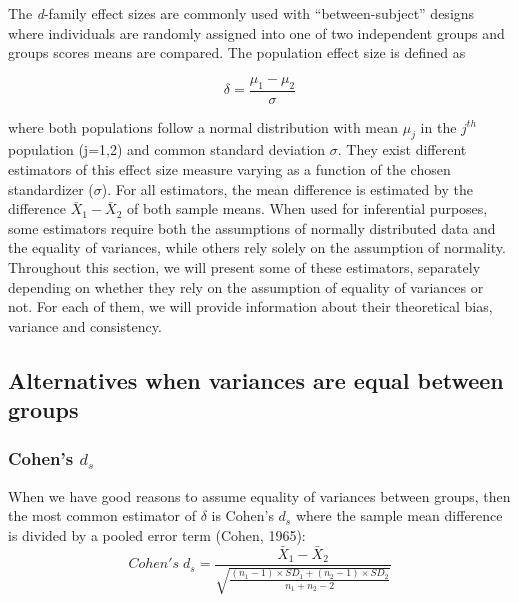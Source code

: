 \documentclass[
  man,floatsintext]{apa6}
\begin{document}
The \emph{d}-family effect sizes are commonly used with \enquote{between-subject} designs where individuals are randomly assigned into one of two independent groups and groups scores means are compared. The population effect size is defined as

\begin{equation} 
\delta = \frac{\mu_{1}-\mu_{2}}{\sigma} 
\label{eq:Cohendelta}
\end{equation}

where both populations follow a normal distribution with mean \(\mu_j\) in the \(j^{th}\) population (j=1,2) and common standard deviation \(\sigma\). They exist different estimators of this effect size measure varying as a function of the chosen standardizer (\(\sigma\)). For all estimators, the mean difference is estimated by the difference \(\bar{X}_1-\bar{X}_2\) of both sample means. When used for inferential purposes, some estimators require both the assumptions of normally distributed data and the equality of variances, while others rely
solely on the assumption of normality. Throughout this section, we will present some of these estimators, separately depending on whether they rely on the assumption of equality of variances or not. For each of them, we will provide information about their theoretical bias, variance and consistency.

\hypertarget{alternatives-when-variances-are-equal-between-groups}{%
\subsection{Alternatives when variances are equal between groups}\label{alternatives-when-variances-are-equal-between-groups}}

\hypertarget{cohens-d_s}{%
\subsubsection{\texorpdfstring{Cohen's \(d_s\)}{Cohen's d\_s}}\label{cohens-d_s}}

When we have good reasons to assume equality of variances between groups, then the most common estimator of \(\delta\) is Cohen's \(d_{s}\) where the sample mean difference is divided by a pooled error term (Cohen, 1965):
\begin{equation} 
Cohen's \; d_s = \frac{\bar{X}_1-\bar{X}_2}{\sqrt{\frac{(n_1-1) \times SD_1+(n_2-1) \times SD_2}{n_1+n_2-2}}} 
\label{eq:Cohends}
\end{equation}
\end{document}
